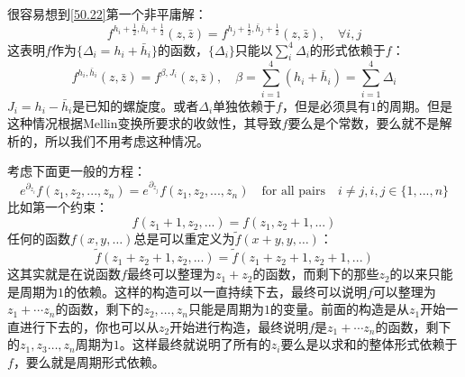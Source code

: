 很容易想到\ref{50.22}第一个非平庸解：
\begin{equation}
	f^{h_i+\frac12,\bar{h}_i+\frac12}(z,\bar{z})=f^{h_j+\frac12,\bar{h}_j+\frac12}(z,\bar{z}),\quad\forall i,j
\end{equation}
这表明$f$作为$\{\Delta_i=h_i+\bar h_i\}$的函数，$\{\Delta_i\}$只能以$\sum_i^4\Delta_i$的形式依赖于$f$：
\begin{equation}
	f^{h_i,\bar{h}_i}(z,\bar{z})=f^{\beta,J_i}(z,\bar{z}),\quad\beta=\sum_{i=1}^4(h_i+\bar{h}_i)=\sum_{i=1}^4\Delta_i
\end{equation}
$J_i=h_i-\bar h_i$是已知的螺旋度。或者$\Delta_i$单独依赖于$f$，但是必须具有$1$的周期。但是这种情况根据Mellin变换所要求的收敛性，其导致$f$要么是个常数，要么就不是解析的，所以我们不用考虑这种情况\cite{Law:2019glh}。
\begin{remark}
	考虑下面更一般的方程：
	\begin{equation}
		e^{\partial_{z_i}}f(z_1,z_2,...,z_n)=e^{\partial_{z_j}}f(z_1,z_2,...,z_n)\quad\text{for all pairs}\quad i\neq j,i,j\in\{1,...,n\}
	\end{equation}
	比如第一个约束：
	\begin{equation}
		f(z_1+1,z_2,...)=f(z_1,z_2+1,...)
	\end{equation}
	任何的函数$f(x,y,\ldots)$总是可以重定义为$\tilde f(x+y,y,\ldots)$：
	\begin{equation}
		\tilde{f}(z_1+z_2+1,z_2,...)=\tilde{f}(z_1+z_2+1,z_2+1,...)
	\end{equation}
	这其实就是在说函数$f$最终可以整理为$z_1+z_2$的函数，而剩下的那些$z_2$的以来只能是周期为$1$的依赖。这样的构造可以一直持续下去，最终可以说明$f$可以整理为$z_1+\cdots z_n$的函数，剩下的$z_2,\ldots ,z_n$只能是周期为$1$的变量。前面的构造是从$z_1$开始一直进行下去的，你也可以从$z_2$开始进行构造，最终说明$f$是$z_1+\cdots z_n$的函数，剩下的$z_1,z_3\ldots ,z_n$周期为$1$。这样最终就说明了所有的$z_i$要么是以求和的整体形式依赖于$f$，要么就是周期形式依赖。
\end{remark}

